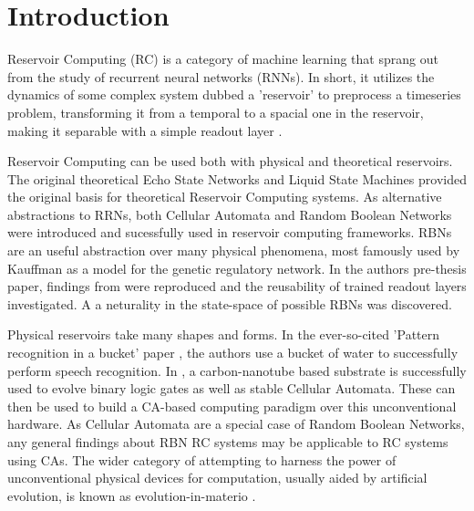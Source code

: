\chapter{Introduction}

Reservoir Computing (RC) is a category of machine learning that sprang out from the study of recurrent neural networks (RNNs).
In short, it utilizes the dynamics of some complex system dubbed a 'reservoir' to preprocess a timeseries problem,
transforming it from a temporal to a spacial one in the reservoir,
making it separable with a simple readout layer \cite{lukovsevivcius2012reservoir}.

Reservoir Computing can be used both with physical and theoretical reservoirs.
The original theoretical Echo State Networks \cite{jaeger2002adaptive} and Liquid State Machines \cite{natschlager2002liquid} provided the original basis for theoretical Reservoir Computing systems.
As alternative abstractions to RRNs,
both Cellular Automata \cite{yilmaz2014reservoir} and Random Boolean Networks \cite{rbn-reservoir} were introduced and sucessfully used in reservoir computing frameworks.
RBNs \cite{gershenson2004introduction} are an useful abstraction over many physical phenomena,
most famously used by Kauffman \cite{kauffman1969metabolic} as a model for the genetic regulatory network.
In the authors pre-thesis paper,
findings from \cite{rbn-reservoir} were reproduced and the reusability of trained readout layers investigated.
A a neturality in the state-space of possible RBNs was discovered.

Physical reservoirs take many shapes and forms.
In the ever-so-cited 'Pattern recognition in a bucket' paper \cite{fernando2003pattern},
the authors use a bucket of water to successfully perform speech recognition.
In \cite{farstad2015evolving},
a carbon-nanotube based substrate is successfully used to evolve binary logic gates as well as stable Cellular Automata.
These can then be used to build a CA-based computing paradigm over this unconventional hardware.
As Cellular Automata are a special case of Random Boolean Networks,
any general findings about RBN RC systems may be applicable to RC systems using CAs.
The wider category of attempting to harness the power of unconventional physical devices for computation,
usually aided by artificial evolution,
is known as evolution-in-materio \cite{miller2002evolution}.

